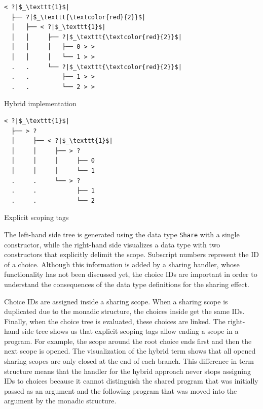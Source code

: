 \documentclass[a4paper, 11pt, fleqn, twoside, abstract=on]{scrreprt}
\newcommand{\hinl}[1]{\texttt{#1}}
\begin{document}
\begin{minipage}{.4 \linewidth}
\begin{verbatim}
< ?|$_\texttt{1}$|
  ├── ?|$_\texttt{\textcolor{red}{2}}$|
  │   ├── < ?|$_\texttt{1}$|
  │   │     ├── ?|$_\texttt{\textcolor{red}{2}}$|
  │   │     │   ├── 0 > >
  │   │     │   └── 1 > >
  .   .     └── ?|$_\texttt{\textcolor{red}{2}}$|
  .   .         ├── 1 > >
  .   .         └── 2 > >
\end{verbatim}
\begin{center}
Hybrid implementation
\end{center}
\end{minipage}
\hspace{.1 \linewidth}
\vline
\hspace{.1 \linewidth}
\begin{minipage}{.475 \linewidth}
\begin{verbatim}
< ?|$_\texttt{1}$|
  ├── > ? 
  │     ├── < ?|$_\texttt{1}$|
  │     │     ├── > ? 
  │     │     │     ├── 0
  │     │     │     └── 1
  .     .     └── > ? 
  .     .           ├── 1
  .     .           └── 2
\end{verbatim}
Explicit scoping tags
\end{minipage}

\vspace{0.32cm}

The left-hand side tree is generated using the data type \hinl{Share} with a single constructor, while the right-hand side visualizes a data type with two constructors that explicitly delimit the scope.
Subscript numbers represent the ID of a choice.
Although this information is added by a sharing handler, whose functionality has not been discussed yet, the choice IDs are important in order to understand the consequences of the data type definitions for the sharing effect.

Choice IDs are assigned inside a sharing scope.
When a sharing scope is duplicated due to the monadic structure, the choices inside get the same IDs.
Finally, when the choice tree is evaluated, these choices are linked.
The right-hand side tree shows us that explicit scoping tags allow ending a scope in a program.
For example, the scope around the root choice ends first and then the next scope is opened.
The visualization of the hybrid term shows that all opened sharing scopes are only closed at the end of each branch.
This difference in term structure means that the handler for the hybrid approach never stops assigning IDs to choices because it cannot distinguish the shared program that was initially passed as an argument and the following program that was moved into the argument by the monadic structure.
\end{document}
